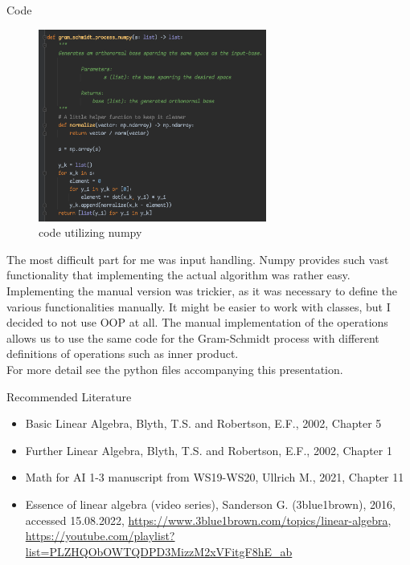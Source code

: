 \documentclass{beamer}
\begin{document}
\begin{frame}{Code}
    \begin{minipage}{0.5\textwidth}
        \begin{figure}[H]
            \includegraphics[width=7.5cm]{code_numpy.png}
            \caption{\label{fig:blue_rectangle} code utilizing numpy}
        \end{figure}
    \end{minipage} \hfill
    \begin{minipage}{0.35\textwidth}
        \tiny
        The most difficult part for me was input handling. Numpy provides such vast functionality that implementing the actual algorithm was rather easy.\\
        Implementing the manual version was trickier, as it was necessary to define the various functionalities manually. It might be easier to work with classes, but I decided to not use OOP at all. The manual implementation of the operations allows us to use the same code for the Gram-Schmidt process with different definitions of operations such as inner product.\\
        For more detail see the python files accompanying this presentation.
    \end{minipage}
\end{frame}

\begin{frame}{Recommended Literature}
    \begin{itemize}
    	\item Basic Linear Algebra, Blyth, T.S. and Robertson, E.F., 2002, Chapter 5
    	\item Further Linear Algebra, Blyth, T.S. and Robertson, E.F., 2002, Chapter 1
    	\item Math for AI 1-3 manuscript from WS19-WS20, Ullrich M., 2021, Chapter 11
    	\item Essence of linear algebra (video series), Sanderson G. (3blue1brown), 2016, accessed 15.08.2022, \url{https://www.3blue1brown.com/topics/linear-algebra}, \url{https://youtube.com/playlist?list=PLZHQObOWTQDPD3MizzM2xVFitgF8hE_ab}
    \end{itemize}
\end{frame}
\end{document}
